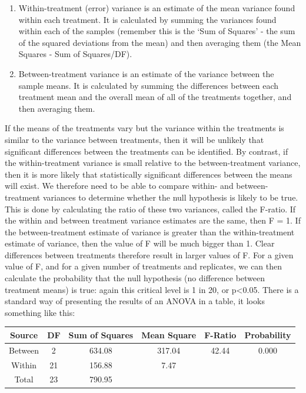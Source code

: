 \documentclass[
]{book}
\providecommand{\tightlist}{%
  \setlength{\itemsep}{0pt}\setlength{\parskip}{0pt}}
\begin{document}
\begin{enumerate}
\def\labelenumi{\arabic{enumi})}
\tightlist
\item
  Within-treatment (error) variance is an estimate of the mean variance found within each treatment. It is calculated by summing the variances found within each of the samples (remember this is the `Sum of Squares' - the sum of the squared deviations from the mean) and then averaging them (the Mean Squares - Sum of Squares/DF).
\item
  Between-treatment variance is an estimate of the variance between the sample means. It is calculated by summing the differences between each treatment mean and the overall mean of all of the treatments together, and then averaging them.
\end{enumerate}

If the means of the treatments vary but the variance within the treatments is similar to the variance between treatments, then it will be unlikely that significant differences between the treatments can be identified. By contrast, if the within-treatment variance is small relative to the between-treatment variance, then it is more likely that statistically significant differences between the means will exist. We therefore need to be able to compare within- and between- treatment variances to determine whether the null hypothesis is likely to be true. This is done by calculating the ratio of these two variances, called the F-ratio. If the within and between treatment variance estimates are the same, then F = 1. If the between-treatment estimate of variance is greater than the within-treatment estimate of variance, then the value of F will be much bigger than 1. Clear differences between treatments therefore result in larger values of F. For a given value of F, and for a given number of treatments and replicates, we can then calculate the probability that the null hypothesis (no difference between treatment means) is true: again this critical level is 1 in 20, or p\textless0.05. There is a standard way of presenting the results of an ANOVA in a table, it looks something like this:

\begin{longtable}[]{@{}cccccc@{}}
\toprule\noalign{}
Source & DF & Sum of Squares & Mean Square & F-Ratio & Probability \\
\midrule\noalign{}
\endhead
\bottomrule\noalign{}
\endlastfoot
Between & 2 & 634.08 & 317.04 & 42.44 & 0.000 \\
Within & 21 & 156.88 & 7.47 & & \\
Total & 23 & 790.95 & & & \\
\end{longtable}
\end{document}

